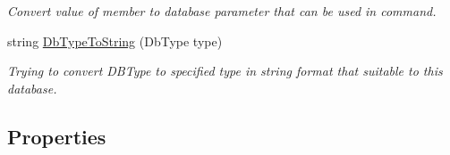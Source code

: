 \begin{DoxyCompactItemize}
\begin{DoxyCompactList}\small\item\em Convert value of member to database parameter that can be used in command. \end{DoxyCompactList}\item 
string \mbox{\hyperlink{class_uniform_data_operator_1_1_sql_1_1_my_sql_1_1_my_sql_data_operator_a7b854ebbcdf31c67716d8c365c321a31}{Db\+Type\+To\+String}} (Db\+Type type)
\begin{DoxyCompactList}\small\item\em Trying to convert D\+B\+Type to specified type in string format that suitable to this database. \end{DoxyCompactList}\end{DoxyCompactItemize}
\subsection*{Properties}
